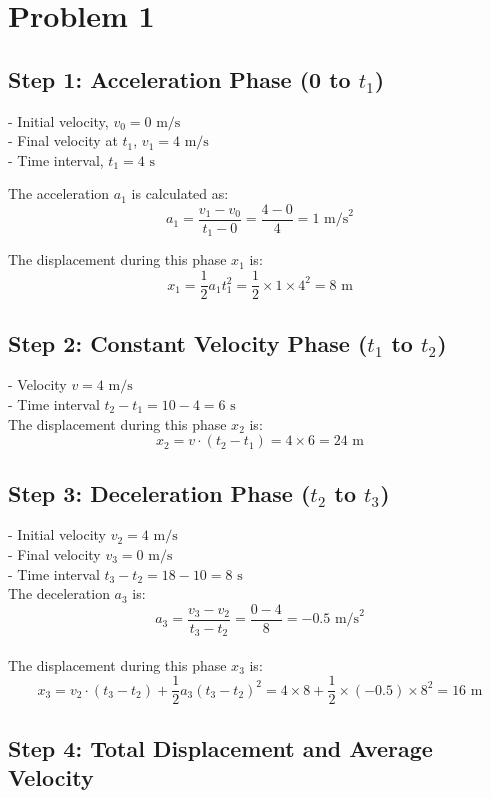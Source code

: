 \section{Problem 1}

\subsection*{Step 1: Acceleration Phase (0 to $t_1$)}

- Initial velocity, $v_0 = 0 \text{ m/s}$ \\
- Final velocity at $t_1$, $v_1 = 4 \text{ m/s}$ \\
- Time interval, $t_1 = 4 \text{ s}$

The acceleration $a_1$ is calculated as:
\[
a_1 = \frac{v_1 - v_0}{t_1 - 0} = \frac{4 - 0}{4} = 1 \text{ m/s}^2
\]

The displacement during this phase $x_1$ is:
\[
x_1 = \frac{1}{2} a_1 t_1^2 = \frac{1}{2} \times 1 \times 4^2 = 8 \text{ m}
\]

\subsection*{Step 2: Constant Velocity Phase ($t_1$ to $t_2$)}

- Velocity $v = 4 \text{ m/s}$ \\
- Time interval $t_2 - t_1 = 10 - 4 = 6 \text{ s}$ \\
The displacement during this phase $x_2$ is:
\[
x_2 = v \cdot (t_2 - t_1) = 4 \times 6 = 24 \text{ m}
\]

\subsection*{Step 3: Deceleration Phase ($t_2$ to $t_3$)}

- Initial velocity $v_2 = 4 \text{ m/s}$ \\
- Final velocity $v_3 = 0 \text{ m/s}$ \\
- Time interval $t_3 - t_2 = 18 - 10 = 8 \text{ s}$ \\
The deceleration $a_3$ is:
\[
a_3 = \frac{v_3 - v_2}{t_3 - t_2} = \frac{0 - 4}{8} = -0.5 \text{ m/s}^2
\] \\
The displacement during this phase $x_3$ is:
\[
x_3 = v_2 \cdot (t_3 - t_2) + \frac{1}{2} a_3 (t_3 - t_2)^2 = 4 \times 8 + \frac{1}{2} \times (-0.5) \times 8^2 = 16 \text{ m}
\]

\subsection*{Step 4: Total Displacement and Average Velocity}

